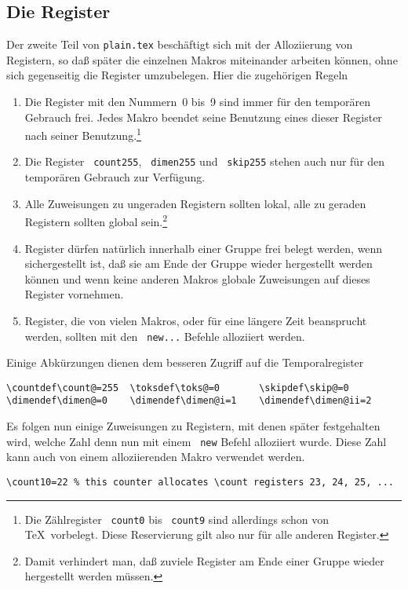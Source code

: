 \begin{appendix}
\subsection{Die Register}
Der zweite Teil von {\tt plain.tex} besch\"aftigt sich mit der
Alloziierung von Registern, so da\ss{} sp\"ater die einzelnen Makros
miteinander arbeiten k\"onnen, ohne sich gegenseitig die Register
umzubelegen. Hier die zugeh\"origen Regeln
\begin{enumerate}
\item Die Register mit den Nummern~0 bis~9 sind immer f\"ur den
tempor\"aren Gebrauch frei. Jedes Makro beendet seine Benutzung eines
dieser Register nach seiner Benutzung.\footnote{Die Z\"ahlregister
{\tt{} count0} bis {\tt{} count9} sind allerdings schon von
\TeX\ vorbelegt. Diese Reservierung gilt also nur f\"ur alle anderen
Register.}
\item Die Register {\tt{} count255}, {\tt{} dimen255} und
{\tt{} skip255} stehen auch nur f\"ur den tempor\"aren Gebrauch zur
Verf\"ugung.
\item Alle Zuweisungen zu ungeraden Registern sollten lokal, alle zu
geraden Registern sollten global sein.\footnote{Damit verhindert man,
da\ss{} zuviele Register am Ende einer Gruppe wieder hergestellt werden
m\"ussen.}
\item Register d\"urfen nat\"urlich innerhalb einer Gruppe frei belegt
werden, wenn sichergestellt ist, da\ss{} sie am Ende der Gruppe wieder
hergestellt werden k\"onnen und wenn keine anderen Makros globale
Zuweisungen auf dieses Register vornehmen.
\item Register, die von vielen Makros, oder f\"ur eine l\"angere Zeit
beansprucht werden, sollten mit den {\tt{} new...} Befehle
alloziiert werden.
\end{enumerate}
Einige Abk\"urzungen dienen dem besseren Zugriff auf die
Temporalregister
\begin{verbatim}
\countdef\count@=255  \toksdef\toks@=0       \skipdef\skip@=0
\dimendef\dimen@=0    \dimendef\dimen@i=1    \dimendef\dimen@ii=2
\end{verbatim}
Es folgen nun einige Zuweisungen zu Registern, mit denen sp\"ater
festgehalten wird, welche Zahl denn nun mit einem {\tt{} new}
Befehl alloziiert wurde. Diese Zahl kann auch von einem alloziierenden
Makro verwendet werden.
\begin{verbatim}
\count10=22 % this counter allocates \count registers 23, 24, 25, ...

\end{verbatim}
\end{appendix}
